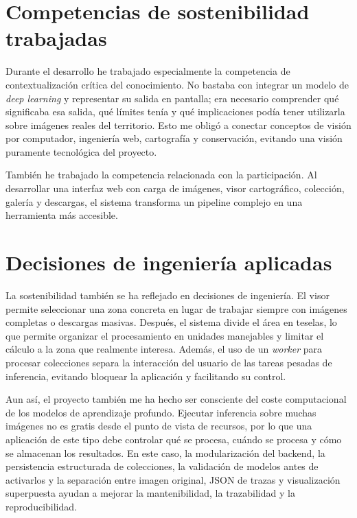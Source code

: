 \section{Competencias de sostenibilidad trabajadas}

Durante el desarrollo he trabajado especialmente la competencia de contextualización crítica del conocimiento. No bastaba con integrar un modelo de \textit{deep learning} y representar su salida en pantalla; era necesario comprender qué significaba esa salida, qué límites tenía y qué implicaciones podía tener utilizarla sobre imágenes reales del territorio. Esto me obligó a conectar conceptos de visión por computador, ingeniería web, cartografía y conservación, evitando una visión puramente tecnológica del proyecto.

También he trabajado la competencia relacionada con la participación. Al desarrollar una interfaz web con carga de imágenes, visor cartográfico, colección, galería y descargas, el sistema transforma un pipeline complejo en una herramienta más accesible.

\section{Decisiones de ingeniería aplicadas}

La sostenibilidad también se ha reflejado en decisiones de ingeniería. El visor permite seleccionar una zona concreta en lugar de trabajar siempre con imágenes completas o descargas masivas. Después, el sistema divide el área en teselas, lo que permite organizar el procesamiento en unidades manejables y limitar el cálculo a la zona que realmente interesa. Además, el uso de un \textit{worker} para procesar colecciones separa la interacción del usuario de las tareas pesadas de inferencia, evitando bloquear la aplicación y facilitando su control.

Aun así, el proyecto también me ha hecho ser consciente del coste computacional de los modelos de aprendizaje profundo. Ejecutar inferencia sobre muchas imágenes no es gratis desde el punto de vista de recursos, por lo que una aplicación de este tipo debe controlar qué se procesa, cuándo se procesa y cómo se almacenan los resultados. En este caso, la modularización del backend, la persistencia estructurada de colecciones, la validación de modelos antes de activarlos y la separación entre imagen original, JSON de trazas y visualización superpuesta ayudan a mejorar la mantenibilidad, la trazabilidad y la reproducibilidad.

